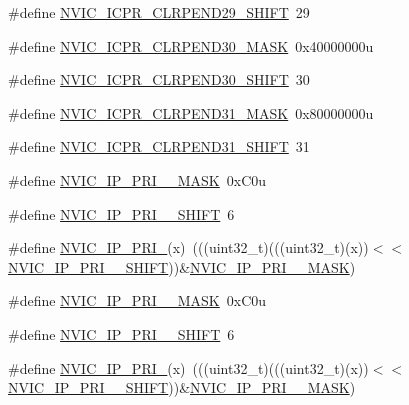 \begin{DoxyCompactItemize}
\item 
\#define \hyperlink{group___n_v_i_c___register___masks_gac7e9279ab315d663b8584ac1d8d46b66}{N\+V\+I\+C\+\_\+\+I\+C\+P\+R\+\_\+\+C\+L\+R\+P\+E\+N\+D29\+\_\+\+S\+H\+I\+FT}~29
\item 
\#define \hyperlink{group___n_v_i_c___register___masks_ga742b5481c4ffee9beb01334f7788f0b2}{N\+V\+I\+C\+\_\+\+I\+C\+P\+R\+\_\+\+C\+L\+R\+P\+E\+N\+D30\+\_\+\+M\+A\+SK}~0x40000000u
\item 
\#define \hyperlink{group___n_v_i_c___register___masks_ga1f8e92056d3c1870e25416ea68f736dc}{N\+V\+I\+C\+\_\+\+I\+C\+P\+R\+\_\+\+C\+L\+R\+P\+E\+N\+D30\+\_\+\+S\+H\+I\+FT}~30
\item 
\#define \hyperlink{group___n_v_i_c___register___masks_ga0cb0970f1e920f2abb4d4e82379c1355}{N\+V\+I\+C\+\_\+\+I\+C\+P\+R\+\_\+\+C\+L\+R\+P\+E\+N\+D31\+\_\+\+M\+A\+SK}~0x80000000u
\item 
\#define \hyperlink{group___n_v_i_c___register___masks_ga6b5fb4e0d86798967c73141e1bd285d9}{N\+V\+I\+C\+\_\+\+I\+C\+P\+R\+\_\+\+C\+L\+R\+P\+E\+N\+D31\+\_\+\+S\+H\+I\+FT}~31
\item 
\#define \hyperlink{group___n_v_i_c___register___masks_ga6cee347aa0bb97ccc21803927e8d30eb}{N\+V\+I\+C\+\_\+\+I\+P\+\_\+\+P\+R\+I\+\_\+\_\+\+M\+A\+SK}~0x\+C0u
\item 
\#define \hyperlink{group___n_v_i_c___register___masks_gaef770ca3c368b767bc1210e8363ff0f7}{N\+V\+I\+C\+\_\+\+I\+P\+\_\+\+P\+R\+I\+\_\+\_\+\+S\+H\+I\+FT}~6
\item 
\#define \hyperlink{group___n_v_i_c___register___masks_ga609b78ced3f231e068404111f7f6c091}{N\+V\+I\+C\+\_\+\+I\+P\+\_\+\+P\+R\+I\+\_}(x)~(((uint32\+\_\+t)(((uint32\+\_\+t)(x))$<$$<$\hyperlink{group___n_v_i_c___register___masks_gaef770ca3c368b767bc1210e8363ff0f7}{N\+V\+I\+C\+\_\+\+I\+P\+\_\+\+P\+R\+I\+\_\+\_\+\+S\+H\+I\+FT}))\&\hyperlink{group___n_v_i_c___register___masks_ga6cee347aa0bb97ccc21803927e8d30eb}{N\+V\+I\+C\+\_\+\+I\+P\+\_\+\+P\+R\+I\+\_\+\_\+\+M\+A\+SK})
\item 
\#define \hyperlink{group___n_v_i_c___register___masks_gaf2a6877536fd82000d2715df7092b410}{N\+V\+I\+C\+\_\+\+I\+P\+\_\+\+P\+R\+I\+\_\+\_\+\+M\+A\+SK}~0x\+C0u
\item 
\#define \hyperlink{group___n_v_i_c___register___masks_ga0c17fc2a8ba9c9a060fa8633ce2d58ce}{N\+V\+I\+C\+\_\+\+I\+P\+\_\+\+P\+R\+I\+\_\+\_\+\+S\+H\+I\+FT}~6
\item 
\#define \hyperlink{group___n_v_i_c___register___masks_gaaf11725cf45f767ae44be6f537a577d8}{N\+V\+I\+C\+\_\+\+I\+P\+\_\+\+P\+R\+I\+\_}(x)~(((uint32\+\_\+t)(((uint32\+\_\+t)(x))$<$$<$\hyperlink{group___n_v_i_c___register___masks_ga0c17fc2a8ba9c9a060fa8633ce2d58ce}{N\+V\+I\+C\+\_\+\+I\+P\+\_\+\+P\+R\+I\+\_\+\_\+\+S\+H\+I\+FT}))\&\hyperlink{group___n_v_i_c___register___masks_gaf2a6877536fd82000d2715df7092b410}{N\+V\+I\+C\+\_\+\+I\+P\+\_\+\+P\+R\+I\+\_\+\_\+\+M\+A\+SK})

\end{DoxyCompactItemize}

